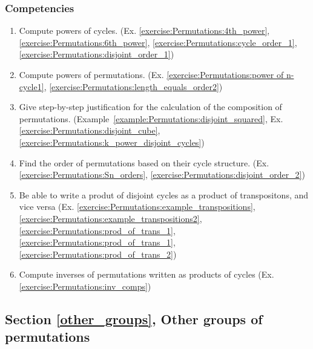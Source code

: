 \subsubsection*{Competencies}
\begin{enumerate}
\item
Compute powers of cycles. (Ex. \ref{exercise:Permutations:4th_power}, \ref{exercise:Permutations:6th_power}, \ref{exercise:Permutations:cycle_order_1}, \ref{exercise:Permutations:disjoint_order_1})
\item
Compute powers of permutations. (Ex. \ref{exercise:Permutations:power of n-cycle1}, \ref{exercise:Permutations:length_equals_order2})
\item
Give step-by-step justification for the calculation of the composition of permutations. (Example~\ref{example:Permutations:disjoint_squared},  Ex. \ref{exercise:Permutations:disjoint_cube}, \ref{exercise:Permutations:k_power_disjoint_cycles})
\item
Find the order of permutations based on their cycle structure. (Ex. \ref{exercise:Permutations:Sn_orders}, \ref{exercise:Permutations:disjoint_order_2})
\item
Be able to write a produt of disjoint cycles as a product of transpositons, and vice versa (Ex. \ref{exercise:Permutations:example_transpositions}, \ref{exercise:Permutations:example_transpositions2}, \ref{exercise:Permutations:prod_of_trans_1}, \ref{exercise:Permutations:prod_of_trans_1}, \ref{exercise:Permutations:prod_of_trans_2})
\item
Compute inverses of permutations written as products of cycles (Ex. \ref{exercise:Permutations:inv_comps})
\end{enumerate}


\subsection*{Section \ref{other_groups}, Other groups of permutations}
